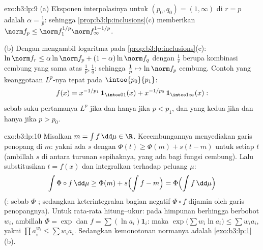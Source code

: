 \begin{solution}{exo:b3:lp:9}
(a) Eksponen interpolasinya untuk $(p_0, q_0) = (1, \infty)$
di $r = p$ adalah $\alpha = \frac1p$: sehingga
\cref{prop:b3:lp:inclusions}(c) memberikan $\norm f_p \leq \norm
f_1^{1/p}\norm f_\infty^{1 - 1/p}$.

(b) Dengan mengambil logaritma pada
\cref{prop:b3:lp:inclusions}(c): $\ln\norm f_r \leq
\alpha\ln\norm f_p + (1-\alpha)\ln\norm f_q$ dengan $\frac1r$
berupa kombinasi cembung yang sama atas $\frac1p, \frac1q$: sehingga $\frac1p
\mapsto \ln\norm f_p$ cembung. Contoh yang keanggotaan $L^p$-nya
tepat pada $\intoo{p_0}{p_1}$:
\[
f(x) = x^{-1/p_1}\,\mathbf 1_{\intoo01}(x) +
x^{-1/p_0}\,\mathbf 1_{\intco1\infty}(x):
\]
sebab suku pertamanya $L^p$ jika dan hanya jika $p < p_1$, dan yang kedua jika dan hanya jika $p >
p_0$.
\end{solution}

\begin{solution}{exo:b3:lp:10}
Misalkan $m = \int f\,\dd\mu \in \R$. Kecembungannya menyediakan garis
penopang di $m$: yakni ada $s$ dengan $\Phi(t) \geq \Phi(m) + s(t -
m)$ untuk setiap $t$ (ambillah $s$ di antara turunan sepihaknya,
yang ada bagi fungsi cembung). Lalu substitusikan $t = f(x)$ dan
integralkan terhadap peluang $\mu$:
\[
\int\Phi\circ f\,\dd\mu \geq \Phi(m) + s\Bigl(\int f - m\Bigr)
= \Phi\Bigl(\int f\,\dd\mu\Bigr)
\]
(: sebab $\Phi$ ; sedangkan keterintegralan bagian
negatif $\Phi\circ f$ dijamin oleh garis
penopangnya). Untuk rata-rata hitung--ukur: pada himpunan berhingga berbobot $w_i$, ambillah
$\Phi = \exp$ dan $f = \sum(\ln a_i)\mathbf 1_i$:
maka $\exp\bigl(\sum w_i\ln a_i\bigr) \leq \sum w_ia_i$, yakni
$\prod a_i^{w_i} \leq \sum w_ia_i$. Sedangkan kemonotonan normanya adalah
\cref{exo:b3:lp:1}(b).
\end{solution}

